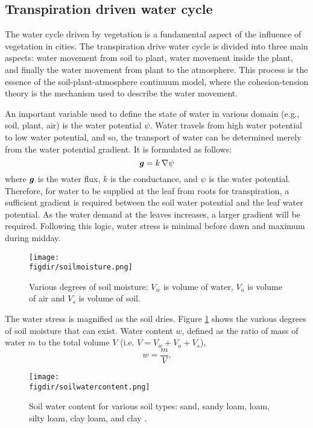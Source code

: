 \subsection{Transpiration driven water cycle}

The water cycle driven by vegetation is a fundamental aspect of the influence of vegetation in cities. The transpiration drive water cycle is divided into three main aspects: water movement from soil to plant, water movement inside the plant, and finally the water movement from plant to the atmosphere. This process is the essence of the soil-plant-atmosphere continuum model, where the cohesion-tension theory is the mechanism used to describe the water movement. 

An important variable used to define the state of water in various domain (e.g., soil, plant, air) is the water potential $\psi$. Water travels from high water potential to low water potential, and so, the transport of water can be determined merely from the water potential gradient. It is formulated as follows:
\begin{equation}
\textbf{\textit{g}} = k\,\nabla \psi
\end{equation}
where $\textbf{\textit{g}}$ is the water flux, $k$ is the conductance, and $\psi$ is the water potential. Therefore, for water to be supplied at the leaf from roots for transpiration, a sufficient gradient is required between the soil water potential and the leaf water potential. As the water demand at the leaves increases, a larger gradient will be required. Following this logic, water stress is minimal before dawn and maximum during midday. 

\begin{figure}[h]
	\centering
	\texttt{[image: \\figdir/soilmoisture.png]}
	\caption{Various degrees of soil moisture: $V_w$ is volume of water, $V_a$ is volume of air and $V_s$ is volume of soil.}
	\label{fig:soilmoisture}
\end{figure}

The water stress is magnified as the soil dries. Figure \ref{fig:soilmoisture} shows the various degrees of soil moisture that can exist. Water content $w$, defined as the ratio of mass of water $m$ to the total volume $V$ (i.e. $V=V_w+V_a+V_s$),
\begin{equation}
w = \frac{m}{V}.
\end{equation}


\begin{figure}[t]
	\centering
	\texttt{[image: \\figdir/soilwatercontent.png]}
	\caption{Soil water content for various soil types: sand, sandy loam, loam, silty loam, clay loam, and clay \citep{nobel2009physicochemical}. }
	\label{fig:soilwatercontent}
\end{figure}


